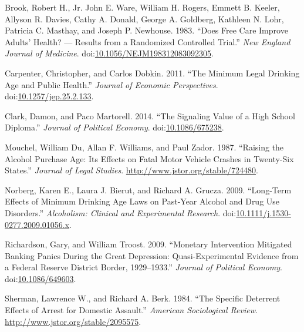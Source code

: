 \documentclass[]{book}
\theoremstyle{definition}
\theoremstyle{definition}
\theoremstyle{definition}
\theoremstyle{remark}
\begin{document}
\hypertarget{ref-BrookWareEtAl1983}{}
Brook, Robert H., Jr. John E. Ware, William H. Rogers, Emmett B. Keeler,
Allyson R. Davies, Cathy A. Donald, George A. Goldberg, Kathleen N.
Lohr, Patricia C. Masthay, and Joseph P. Newhouse. 1983. ``Does Free
Care Improve Adults' Health? --- Results from a Randomized Controlled
Trial.'' \emph{New England Journal of Medicine}.
doi:\href{https://doi.org/10.1056/NEJM198312083092305}{10.1056/NEJM198312083092305}.

\hypertarget{ref-CarpenterDobkin2009}{}
Carpenter, Christopher, and Carlos Dobkin. 2011. ``The Minimum Legal
Drinking Age and Public Health.'' \emph{Journal of Economic
Perspectives}.
doi:\href{https://doi.org/10.1257/jep.25.2.133}{10.1257/jep.25.2.133}.

\hypertarget{ref-ClarkMartorell2014}{}
Clark, Damon, and Paco Martorell. 2014. ``The Signaling Value of a High
School Diploma.'' \emph{Journal of Political Economy}.
doi:\href{https://doi.org/10.1086/675238}{10.1086/675238}.

\hypertarget{ref-DuMouchelWilliamsZador1987}{}
Mouchel, William Du, Allan F. Williams, and Paul Zador. 1987. ``Raising
the Alcohol Purchase Age: Its Effects on Fatal Motor Vehicle Crashes in
Twenty-Six States.'' \emph{Journal of Legal Studies}.
\url{http://www.jstor.org/stable/724480}.

\hypertarget{ref-NorbergBierutGrucza2009}{}
Norberg, Karen E., Laura J. Bierut, and Richard A. Grucza. 2009.
``Long-Term Effects of Minimum Drinking Age Laws on Past-Year Alcohol
and Drug Use Disorders.'' \emph{Alcoholism: Clinical and Experimental
Research}.
doi:\href{https://doi.org/10.1111/j.1530-0277.2009.01056.x}{10.1111/j.1530-0277.2009.01056.x}.

\hypertarget{ref-RichardsonTroost2009}{}
Richardson, Gary, and William Troost. 2009. ``Monetary Intervention
Mitigated Banking Panics During the Great Depression: Quasi-Experimental
Evidence from a Federal Reserve District Border, 1929--1933.''
\emph{Journal of Political Economy}.
doi:\href{https://doi.org/10.1086/649603}{10.1086/649603}.

\hypertarget{ref-ShermanBerk1984}{}
Sherman, Lawrence W., and Richard A. Berk. 1984. ``The Specific
Deterrent Effects of Arrest for Domestic Assault.'' \emph{American
Sociological Review}. \url{http://www.jstor.org/stable/2095575}.
\end{document}
